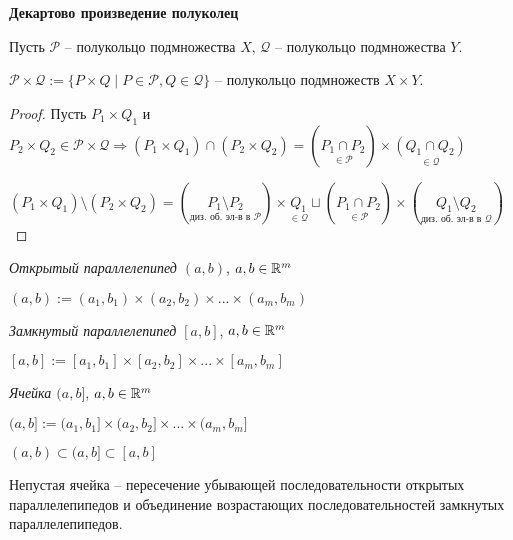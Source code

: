 \begin{theorem}
    \textbf{Декартово произведение полуколец}

    Пусть $\mathcal{P}$ – полукольцо подмножества $X$, $\mathcal{Q}$ – полукольцо подмножества $Y$.

    $\mathcal{P}\times \mathcal{Q} := \{ P\times Q \mid P \in \mathcal{P}, Q\in \mathcal{Q}\}$ – полукольцо подмножеств $X\times Y$.
\end{theorem}

\begin{proof}
    Пусть $P_1\times Q_1$ и $P_2\times Q_2\in \mathcal{P}\times \mathcal{Q}\Rightarrow (P_1\times Q_1) \cap (P_2\times Q_2)=(\underset{\in \mathcal{P}}{P_1\cap P_2})\times \underset{\in \mathcal{Q}}{(Q_1\cap Q_2)}$

    $(P_1\times Q_1) \setminus (P_2\times Q_2)= (\underset{\text{диз. об. эл-в в }\mathcal{P}}{P_1 \setminus P_2}) \times \underset{\in \mathcal{Q}}{Q_1} \sqcup ( \underset{\in \mathcal{P}}{P_1\cap P_2}) \times (\underset{\text{диз. об. эл-в в }\mathcal{Q}}{Q_1\setminus Q_2})$
\end{proof}

\begin{definition}
    \textit{Открытый параллелепипед $(a, b)$}, $a, b\in \mathbb{R}^m$

    $(a, b):= (a_1, b_1)\times (a_2, b_2)\times ...\times (a_m, b_m)$
\end{definition}

\begin{definition}
    \textit{Замкнутый параллелепипед $[a, b]$}, $a, b\in \mathbb{R}^m$

    $[a, b]:= [a_1, b_1]\times [a_2, b_2]\times ...\times [a_m, b_m]$
\end{definition}

\begin{definition}
    \textit{Ячейка $(a, b]$}, $a, b\in \mathbb{R}^m$

    $(a, b]:= (a_1, b_1]\times (a_2, b_2]\times ...\times (a_m, b_m]$
\end{definition}

\begin{remark}
    $(a, b)\subset (a, b]\subset [a, b]$
\end{remark}

\begin{statement}
    Непустая ячейка – пересечение убывающей последовательности открытых параллелепипедов
    и объединение возрастающих последовательностей замкнутых параллелепипедов.
\end{statement}

